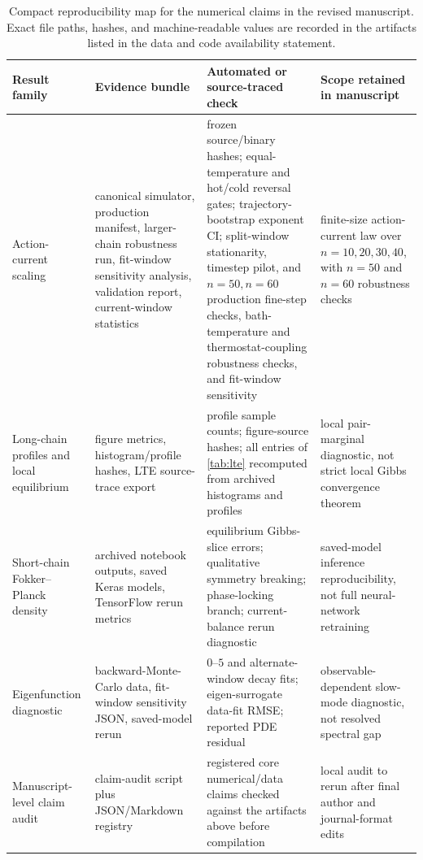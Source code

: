 \documentclass[11pt,a4paper]{article}
\theoremstyle{definition}
\numberwithin{equation}{section}   %
\begin{document}
\begin{table}[ht]\centering
\small
\setlength{\tabcolsep}{2pt}
\begin{tabular}{>{\raggedright\arraybackslash}p{}
                >{\raggedright\arraybackslash}p{}
                >{\raggedright\arraybackslash}p{}
                >{\raggedright\arraybackslash}p{}}
\toprule
Result family & Evidence bundle & Automated or source-traced check & Scope retained in manuscript \\
\midrule
Action-current scaling &
canonical simulator, production manifest, larger-chain robustness run,
fit-window sensitivity analysis, validation report, current-window statistics &
frozen source/binary hashes; equal-temperature and hot/cold reversal gates;
trajectory-bootstrap exponent CI; split-window stationarity, timestep pilot,
and $n=50,n=60$ production fine-step checks,
bath-temperature and thermostat-coupling robustness checks, and fit-window sensitivity &
finite-size action-current law over $n=10,20,30,40$, with $n=50$
and $n=60$ robustness checks \\
\midrule
Long-chain profiles and local equilibrium &
figure metrics, histogram/profile hashes, LTE source-trace export &
profile sample counts; figure-source hashes; all entries of \cref{tab:lte}
recomputed from archived histograms and profiles &
local pair-marginal diagnostic, not strict local Gibbs convergence theorem \\
\midrule
Short-chain Fokker--Planck density &
archived notebook outputs, saved Keras models, TensorFlow rerun metrics &
equilibrium Gibbs-slice errors; qualitative symmetry breaking; phase-locking
branch; current-balance rerun diagnostic &
saved-model inference reproducibility, not full neural-network retraining \\
\midrule
Eigenfunction diagnostic &
backward-Monte-Carlo data, fit-window sensitivity JSON, saved-model rerun &
$0$--$5$ and alternate-window decay fits; eigen-surrogate data-fit RMSE;
reported PDE residual &
observable-dependent slow-mode diagnostic, not resolved spectral gap \\
\midrule
Manuscript-level claim audit &
claim-audit script plus JSON/Markdown registry &
registered core numerical/data claims checked against the artifacts above
before compilation &
local audit to rerun after final author and journal-format edits \\
\bottomrule
\end{tabular}
\caption{Compact reproducibility map for the numerical claims in the revised
manuscript. Exact file paths, hashes, and machine-readable values are recorded
in the artifacts listed in the data and code availability statement.}
\label{tab:repro-summary}
\end{table}
\end{document}
